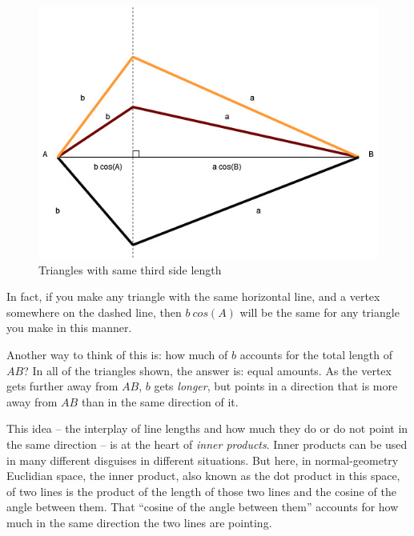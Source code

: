 \documentclass[
]{book}
\begin{document}
\begin{figure}

{\centering \includegraphics[width=0.75\linewidth,height=0.75\textheight]{images/Triangles-bcosA} 

}

\caption{Triangles with same third side length}\label{fig:unnamed-chunk-2}
\end{figure}

In fact, if you make any triangle with the same horizontal line, and a vertex somewhere on the dashed line, then \(b\ cos(A)\) will be the same for any triangle you make in this manner.

Another way to think of this is: how much of \(b\) accounts for the total length of \(AB\)? In all of the triangles shown, the answer is: equal amounts. As the vertex gets further away from \(AB\), \(b\) gets \emph{longer}, but points in a direction that is more away from \(AB\) than in the same direction of it.

This idea -- the interplay of line lengths and how much they do or do not point in the same direction -- is at the heart of \emph{inner products}. Inner products can be used in many different disguises in different situations. But here, in normal-geometry Euclidian space, the inner product, also known as the dot product in this space, of two lines is the product of the length of those two lines and the cosine of the angle between them. That ``cosine of the angle between them'' accounts for how much in the same direction the two lines are pointing.
\end{document}
